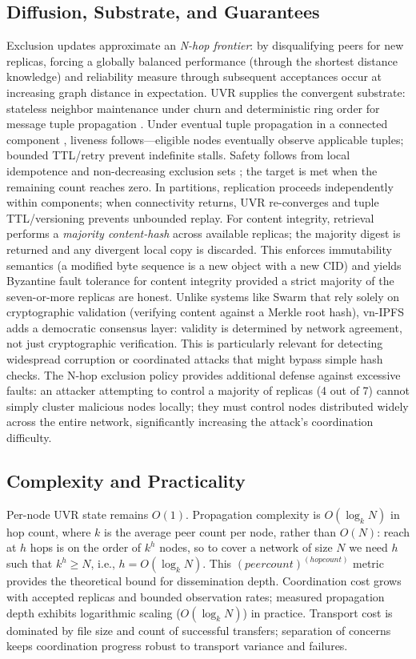 \documentclass[runningheads]{llncs}
\begin{document}
\subsection{Diffusion, Substrate, and Guarantees}
Exclusion updates approximate an \emph{N-hop frontier}: by  disqualifying peers for new replicas, forcing a globally balanced performance (through the shortest distance knowledge) and reliability measure through subsequent acceptances occur at increasing graph distance in expectation. UVR supplies the convergent substrate: stateless neighbor maintenance under churn and deterministic ring order for message tuple propagation \cite{Jelasity2005Gossip}. Under eventual tuple propagation in a connected component \cite{Burckhardt2014EC}, liveness follows—eligible nodes eventually observe applicable tuples; bounded TTL/retry prevent indefinite stalls. Safety follows from local idempotence and non-decreasing exclusion sets \cite{ShapiroCRDT2011}; the target is met when the remaining count reaches zero. In partitions, replication proceeds independently within components; when connectivity returns, UVR re-converges and tuple TTL/versioning prevents unbounded replay. For content integrity, retrieval performs a \emph{majority content-hash} across available replicas; the majority digest is returned and any divergent local copy is discarded. This enforces immutability semantics (a modified byte sequence is a new object with a new CID) and yields Byzantine fault tolerance for content integrity provided a strict majority of the seven-or-more replicas are honest. Unlike systems like Swarm that rely solely on cryptographic validation (verifying content against a Merkle root hash), vn-IPFS adds a democratic consensus layer: validity is determined by network agreement, not just cryptographic verification. This is particularly relevant for detecting widespread corruption or coordinated attacks that might bypass simple hash checks. The N-hop exclusion policy provides additional defense against excessive faults: an attacker attempting to control a majority of replicas (4 out of 7) cannot simply cluster malicious nodes locally; they must control nodes distributed widely across the entire network, significantly increasing the attack's coordination difficulty.

\subsection{Complexity and Practicality}
Per-node UVR state remains \(O(1)\). Propagation complexity is \(O(\log_k N)\) in hop count, where \(k\) is the average peer count per node, rather than \(O(N)\): reach at \(h\) hops is on the order of \(k^h\) nodes, so to cover a network of size \(N\) we need \(h\) such that \(k^h \geq N\), i.e., \(h = O(\log_k N)\). This \(({\mathit{peercount}})^{({\mathit{hopcount}})}\) metric provides the theoretical bound for dissemination depth. Coordination cost grows with accepted replicas and bounded observation rates; measured propagation depth exhibits logarithmic scaling ($O(\log_k N)$) in practice. Transport cost is dominated by file size and count of successful transfers; separation of concerns keeps coordination progress robust to transport variance and failures.
\end{document}
